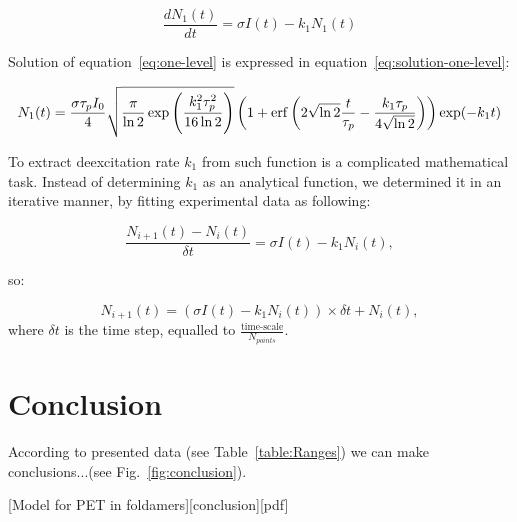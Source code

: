 \begin{equation}
\label{eq:one-level}
\dfrac{dN_1(t)}{dt}=\sigma I(t)-k_1N_1(t)
\end{equation}


Solution of equation~\ref{eq:one-level} is expressed in equation~\ref{eq:solution-one-level}:

\begin{equation}
\label{eq:solution-one-level}
N_1(t)=\dfrac{\sigma \tau_pI_0}{4}\sqrt{\dfrac{\pi}{\ln 2}\exp\left(\dfrac{k_1^2 \tau_p^2}{16\ln2}\right)}\left(1+\operatorname{erf}\left(2\sqrt{\ln 2}\dfrac{t}{\tau_p}-\dfrac{k_1\tau_p}{4\sqrt{\ln2}}\right)\right)\exp(-k_1t)
\end{equation}

To extract deexcitation rate $k_1$ from such function is a complicated mathematical task. Instead of determining $k_1$ as an analytical function, we determined it in an iterative manner, by fitting experimental data as following:

\[
\dfrac{N_{i+1}(t)-N_{i}(t)}{\delta t}=\sigma I(t)-k_1N_i(t),
\]

\noindent so:

\[
N_{i+1}(t)=\left(\sigma I(t)-k_1N_{i}(t)\right)\times \delta t +N_{i}(t),
\] 
\noindent where $\delta t$ is the time step, equalled to $\frac{\text{time-scale}}{N_{points}}$.


\section{Conclusion}
\label{sec:2ch-conslusion}

According to presented data (see Table~\ref{table:Ranges}) we can make conclusions...(see Fig.~\ref{fig:conclusion}).


[Model for PET in foldamers][conclusion][pdf]





\stopcontents[chapter]